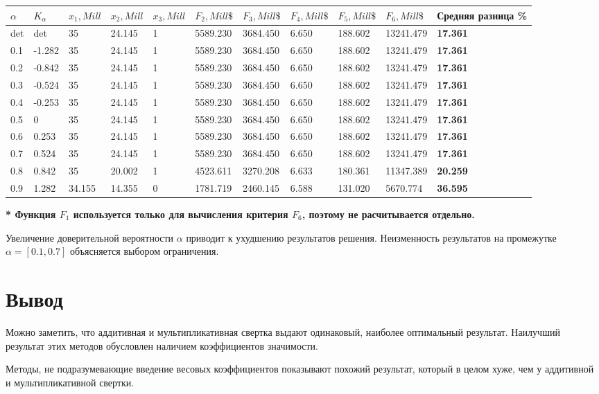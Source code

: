 \documentclass[14pt,a4paper,report]{report}
\begin{document}
\begin{table}[h!]
	\centering
	\bgroup
	\def\arraystretch{1}
	\begin{tabular}{ | m{0.7cm} | m{1.0cm} | m{1.05cm} | m{1.05cm} | m{1.05cm} | m{1.35cm} | m{1.35cm} | m{1.35cm} | m{1.35cm} | m{1.35cm} | m{1.4cm} | }
		\hline
		$\alpha$ & $K_\alpha$ & $x_1, Mill$ & $x_2, Mill$ & $x_3, Mill$ & $F_2, Mill\$$ & $F_3, Mill\$$ & $F_4, Mill\$$ & $F_5, Mill\$$ & $F_6, Mill\$$ & Средняя разница \% \\ \hline
		det & det & 35 & 24.145 & 1 & 5589.230 & 3684.450 & 6.650 & 188.602 & 13241.479 & \textbf{17.361} \\ \hline
		0.1 & -1.282 & 35 & 24.145 & 1 & 5589.230 & 3684.450 & 6.650 & 188.602 & 13241.479 & \textbf{17.361} \\ \hline
		0.2 & -0.842 & 35 & 24.145 & 1 & 5589.230 & 3684.450 & 6.650 & 188.602 & 13241.479 & \textbf{17.361} \\ \hline
		0.3 & -0.524 & 35 & 24.145 & 1 & 5589.230 & 3684.450 & 6.650 & 188.602 & 13241.479 & \textbf{17.361} \\ \hline
		0.4 & -0.253 & 35 & 24.145 & 1 & 5589.230 & 3684.450 & 6.650 & 188.602 & 13241.479 & \textbf{17.361} \\ \hline
		0.5 & 0 & 35 & 24.145 & 1 & 5589.230 & 3684.450 & 6.650 & 188.602 & 13241.479 & \textbf{17.361} \\ \hline
		0.6 & 0.253 & 35 & 24.145 & 1 & 5589.230 & 3684.450 & 6.650 & 188.602 & 13241.479 & \textbf{17.361} \\ \hline
		0.7 & 0.524 & 35 & 24.145 & 1 & 5589.230 & 3684.450 & 6.650 & 188.602 & 13241.479 & \textbf{17.361} \\ \hline
		0.8 & 0.842 & 35 & 20.002 & 1 & 4523.611 & 3270.208 & 6.633 & 180.361 & 11347.389 & \textbf{20.259} \\ \hline
		0.9 & 1.282 & 34.155 & 14.355 & 0 & 1781.719 & 2460.145 & 6.588 & 131.020 & 5670.774 & \textbf{36.595} \\
		\hline
	\end{tabular}
	\egroup
\end{table}

\textbf{* Функция $F_1$ используется только для вычисления критерия $F_6$, поэтому не расчитывается отдельно.}

Увеличение доверительной вероятности $\alpha$ приводит к ухудшению результатов решения. Неизменность результатов на промежутке $\alpha=[0.1, 0.7]$ объясняется выбором ограничения.

\section{Вывод}

Можно заметить, что аддитивная и мультипликативная свертка выдают одинаковый, наиболее оптимальный результат. Наилучший результат этих методов обусловлен наличием коэффициентов значимости.

Методы, не подразумевающие введение весовых коэффициентов показывают похожий результат, который в целом хуже, чем у аддитивной и мультипликативной свертки.
\end{document}
